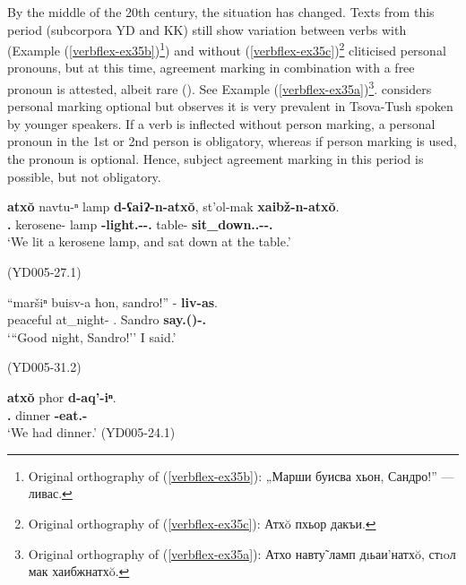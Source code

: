 By the middle of the 20th century, the situation has changed. Texts from this period (subcorpora YD and KK) still show variation between verbs with (Example (\ref{verbflex-ex35b})\footnote{Original orthography of (\ref{verbflex-ex35b}): „Марши буисва хьон, Сандро!'' — ливас.}) and without (\ref{verbflex-ex35c})\footnote{Original orthography of (\ref{verbflex-ex35c}):     Атх\u{o} пхьор дакъи.} cliticised personal pronouns, but at this time, agreement marking in combination with a free pronoun is attested, albeit rare (\cites[84]{desheriev53}[284]{kojima19}). See Example (\ref{verbflex-ex35a})\footnote{Original orthography of (\ref{verbflex-ex35a}): Атхо навт\~{у} ламп дıьаи'натх\u{o}, стıoл мак хаибжнатх\u{o}.}. \textcite{chrelashvili82} considers personal marking optional but observes it is very prevalent in Tsova-Tush spoken by younger speakers. If a verb is inflected without person marking, a personal pronoun in the 1st or 2nd person is obligatory, whereas if person marking is used, the pronoun is optional. Hence, subject agreement marking in this period is possible, but not obligatory.

\begin{exe}
	\ex\label{verbflex-ex35}
	\begin{xlist}
		
		\ex\label{verbflex-ex35a}
		\gll \textbf{atx\u{o}} navtu-ⁿ lamp \textbf{d-ʕaiɁ-n-atx\u{o}}, st'ol-mak \textbf{xaibž-n-atx\u{o}}.  \\
		\textbf{{\Fpl}.{\Erg}} kerosene-{\Gen} lamp \textbf{{\D}-light.{\Pfv}-{\Aor}-{\Fpl}.{\Erg}} table-{\Superlat} \textbf{sit\_down.{\Pfv}.{\Pl}-{\Aor}-{\Fpl}.{\Erg}} \\
		\trans `We lit a kerosene lamp, and sat down at the table.'

		\hfill (YD005-27.1)
		
		
		\ex\label{verbflex-ex35b}
		\gll ``maršiⁿ buisv-a ħon, sandro!'' - \textbf{liv-as}. \\
		peaceful at\_night-{\Nmlz} {\Ssg}.{\Dat} Sandro {} \textbf{say.{\Ipfv}({\Npst})-{\Fsg}.{\Erg}} \\
		\trans `{``}Good night, Sandro!'' I said.'

		\hfill (YD005-31.2) 
		
				\ex\label{verbflex-ex35c}
		\gll \textbf{atx\u{o}} pħor \textbf{d-aq'-iⁿ}. \\
		\textbf{{\Fpl}.{\Erg}} dinner \textbf{{\D}-eat.{\Pfv}-{\Aor}} \\
		\trans `We had dinner.'
		\hfill (YD005-24.1)
		
		
		
	\end{xlist}
\end{exe}

